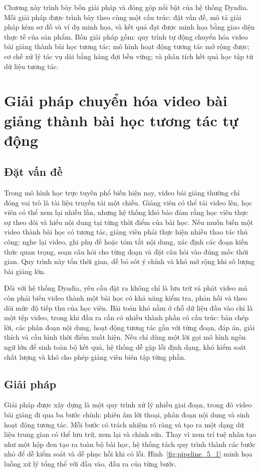 \documentclass[../DoAn.tex]{subfiles}
\begin{document}
Chương này trình bày bốn giải pháp và đóng góp nổi bật của hệ thống Dyadia. Mỗi giải pháp được trình bày theo cùng một cấu trúc: đặt vấn đề, mô tả giải pháp kèm sơ đồ và ví dụ minh họa, và kết quả đạt được minh họa bằng giao diện thực tế của sản phẩm. Bốn giải pháp gồm: quy trình tự động chuyển hóa video bài giảng thành bài học tương tác; mô hình hoạt động tương tác mở rộng được; cơ chế xử lý tác vụ dài bằng hàng đợi bền vững; và phân tích kết quả học tập từ dữ liệu tương tác.

\section{Giải pháp chuyển hóa video bài giảng thành bài học tương tác tự động}
\label{section:5.1}
\subsection{Đặt vấn đề}
Trong mô hình học trực tuyến phổ biến hiện nay, video bài giảng thường chỉ đóng vai trò là tài liệu truyền tải một chiều. Giảng viên có thể tải video lên, học viên có thể xem lại nhiều lần, nhưng hệ thống khó bảo đảm rằng học viên thực sự theo dõi và hiểu nội dung tại từng thời điểm của bài học. Nếu muốn biến một video thành bài học có tương tác, giảng viên phải thực hiện nhiều thao tác thủ công: nghe lại video, ghi phụ đề hoặc tóm tắt nội dung, xác định các đoạn kiến thức quan trọng, soạn câu hỏi cho từng đoạn và đặt câu hỏi vào đúng mốc thời gian. Quy trình này tốn thời gian, dễ bỏ sót ý chính và khó mở rộng khi số lượng bài giảng lớn.

Đối với hệ thống Dyadia, yêu cầu đặt ra không chỉ là lưu trữ và phát video mà còn phải biến video thành một bài học có khả năng kiểm tra, phản hồi và theo dõi mức độ tiếp thu của học viên. Bài toán khó nằm ở chỗ dữ liệu đầu vào chỉ là một tệp video, trong khi đầu ra cần có nhiều thành phần có cấu trúc: bản chép lời, các phân đoạn nội dung, hoạt động tương tác gắn với từng đoạn, đáp án, giải thích và cấu hình thời điểm xuất hiện. Nếu chỉ dùng một lời gọi mô hình ngôn ngữ lớn để sinh toàn bộ kết quả, hệ thống dễ gặp lỗi định dạng, khó kiểm soát chất lượng và khó cho phép giảng viên biên tập từng phần.

\subsection{Giải pháp}
Giải pháp được xây dựng là một quy trình xử lý nhiều giai đoạn, trong đó video bài giảng đi qua ba bước chính: phiên âm lời thoại, phân đoạn nội dung và sinh hoạt động tương tác. Mỗi bước có trách nhiệm rõ ràng và tạo ra một dạng dữ liệu trung gian có thể lưu trữ, xem lại và chỉnh sửa. Thay vì xem trí tuệ nhân tạo như một hộp đen tạo ra toàn bộ bài học, hệ thống tách quy trình thành các bước nhỏ để dễ kiểm soát và dễ phục hồi khi có lỗi. Hình~\ref{fig:pipeline_5_1} minh họa luồng xử lý tổng thể với đầu vào, đầu ra của từng bước.
\end{document}
